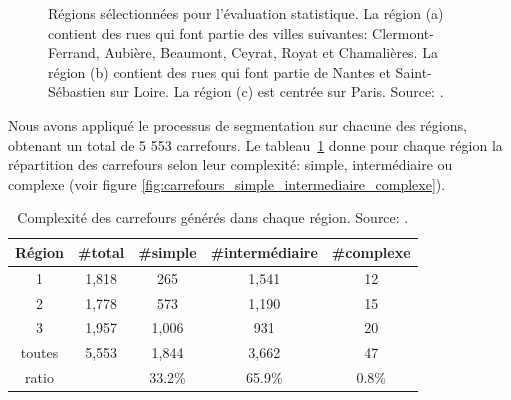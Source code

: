 \begin{figure}[H]
\begin{subfigure}[t]{0.32\linewidth}
        \caption{}
        \label{fig:parisRegion}
    \end{subfigure}
    \caption[Régions sélectionnées pour l'évaluation statistique]{Régions sélectionnées pour l'évaluation statistique. La région (a) contient des rues qui font partie des villes suivantes: Clermont-Ferrand, Aubière, Beaumont, Ceyrat, Royat et Chamalières. La région (b) contient des rues qui font partie de Nantes et Saint-Sébastien sur Loire. La région (c) est centrée sur Paris. Source: \citep{Favreau2022}.}
    \label{fig:regions}
\end{figure}

\pagebreak

Nous avons appliqué le processus de segmentation sur chacune des régions, obtenant un total de 5 553 carrefours. Le tableau~\ref{tab:initRegions} donne pour chaque région la répartition des carrefours selon leur complexité: simple, intermédiaire ou complexe (voir figure \ref{fig:carrefours_simple_intermediaire_complexe}). 

\begin{table}[ht] 
    \centering
    \footnotesize
    \begin{tabular}{c|c|c|c|c}
    Région & \#total & \#simple &\#intermédiaire & \#complexe \\
    \hline
     1 & 1,818 & 265 & 1,541  & 12 \\
     2 & 1,778 & 573 & 1,190 & 15 \\
     3 & 1,957 & 1,006 & 931  & 20 \\
     \hline
     toutes & 5,553  & 1,844 & 3,662 &	47  \\
     \hline
     ratio & & 33.2\% & 65.9\% & 0.8\% \\
    \end{tabular}
    \caption[Complexité des carrefours générés dans chaque région]{Complexité des carrefours générés dans chaque région. Source: \citep{Favreau2022}.}
    \label{tab:initRegions}
\end{table}


